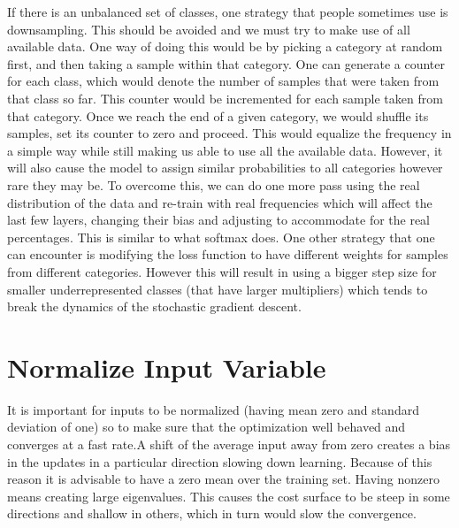 If there is an unbalanced set of classes, one strategy that people sometimes use is downsampling. This should be avoided and we must try to make use of all available data. One way of doing this would be by picking a category at random first, and then taking a sample within that category. One can generate a counter for each class, which would denote the number of samples that were taken from that class so far. This counter would be incremented for each sample taken from that category. Once we reach the end of a given category, we would shuffle its samples, set its counter to zero and proceed. This would equalize the frequency in a simple way while still making us able to use all the available data. However, it will also cause the model to assign similar probabilities to all categories however rare they may be.  To overcome this, we can do one more pass using the real distribution of the data and re-train with real frequencies which will affect the last few layers, changing their bias and adjusting to accommodate for the real percentages. This is similar to what softmax does. One other strategy that one can encounter is modifying the loss function to have different weights for samples from different categories. However this will result in using a bigger step size for smaller underrepresented classes (that have larger multipliers) which tends to break the dynamics of the stochastic gradient descent.\\

{\centering{}\par}
\vspace{5pt}

\section{Normalize Input Variable} 
It is important for inputs to be normalized (having mean zero and standard deviation of one) so to make sure that the optimization well behaved and converges at a fast rate.A shift of the average input away from zero creates a bias in the updates in a particular direction slowing down learning. Because of this reason it is advisable to have a zero mean over the training set. Having nonzero means creating large eigenvalues. This causes the cost surface to be steep in some directions and shallow in others, which in turn would slow the convergence. \\

